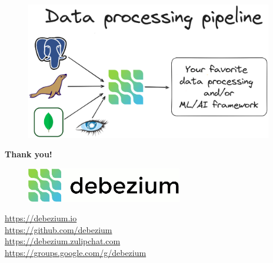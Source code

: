 \documentclass[10pt,utf8]{beamer}
\begin{document}
\begin{frame}
    \begin{figure}
        \centering
        \includegraphics[height=6cm]{./img/dbs_to_ml.eps}
    \end{figure}
\end{frame}

\begin{frame}
    \centering
    \textbf{\Huge{Thank you!}}
    
    \vspace{1cm}
    
    \begin{figure}
        \centering
        \includegraphics[height=1.5cm]{./img/debezium.eps}
    \end{figure}
    
    \vspace{0.5cm}
    
    \centering
    \color{blue}
    \url{https://debezium.io}\\
    \url{https://github.com/debezium}\\
    \url{https://debezium.zulipchat.com}\\
    \url{https://groups.google.com/g/debezium}\\
    \color{black}
\end{frame}


\end{document}
